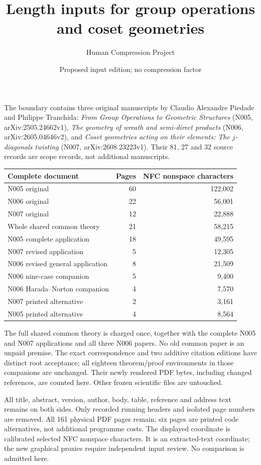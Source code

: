 \documentclass[11pt,a4paper]{article}
\title{Length inputs for group operations and coset geometries}\author{Human Compression Project}\date{Proposed input edition; no compression factor}
\begin{document}
\maketitle
The boundary contains three original manuscripts by Claudio Alexandre Piedade and Philippe Tranchida: \emph{From Group Operations to Geometric Structures} (N005, arXiv:2505.24662v1), \emph{The geometry of wreath and semi-direct products} (N006, arXiv:2605.04646v2), and \emph{Coset geometries acting on their elements: The $j$-diagonals twisting} (N007, arXiv:2608.23223v1). Their 81, 27 and 32 source records are scope records, not additional manuscripts.
\begin{center}\begin{tabular}{lrr}\toprule
Complete document & Pages & NFC nonspace characters\\\midrule
N005 original & 60 & 122,002\\
N006 original & 22 & 56,001\\
N007 original & 12 & 22,888\\
Whole shared common theory & 21 & 58,215\\
N005 complete application & 18 & 49,595\\
N007 revised application & 5 & 12,305\\
N006 revised general application & 8 & 21,509\\
N006 nine-case companion & 5 & 9,400\\
N006 Harada--Norton companion & 4 & 7,570\\
N007 printed alternative & 2 & 3,161\\
N005 printed alternative & 4 & 8,564\\
\bottomrule\end{tabular}\end{center}
The full shared common theory is charged once, together with the complete N005 and N007 applications and all three N006 papers. No old common paper is an unpaid premise. The exact correspondence and two additive citation editions have distinct root acceptance; all eighteen theorem/proof environments in those companions are unchanged. Their newly rendered PDF bytes, including changed references, are counted here. Other frozen scientific files are untouched.

All title, abstract, version, author, body, table, reference and address text remains on both sides. Only recorded running headers and isolated page numbers are removed. All 161 physical PDF pages remain; six pages are printed code alternatives, not additional programme costs. The displayed coordinate is calibrated selected NFC nonspace characters. It is an extracted-text coordinate; the new graphical proxies require independent input review. No comparison is admitted here.
\end{document}
